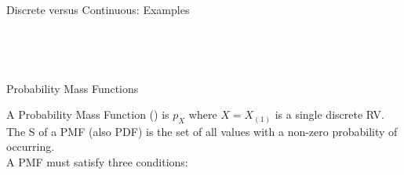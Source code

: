 \documentclass[10pt,sans,english,compress,table,xcolor=dvipsnames]{beamer}
\begin{document}
\begin{frame}{Discrete versus Continuous: Examples}

 \hspace{5cm} \\[1ex]

\vspace{4cm}

\\[1ex]
\end{frame}

\begin{frame}{Probability Mass Functions}

A Probability Mass Function () is $p_X$ where $X=X_{(1)}$ is a single discrete RV.\\[1ex]

The  S of a PMF (also PDF) is the set of all values with a non-zero probability of occurring.\\[1ex]

A PMF must satisfy three conditions:\\
\end{frame} 
\end{document}
